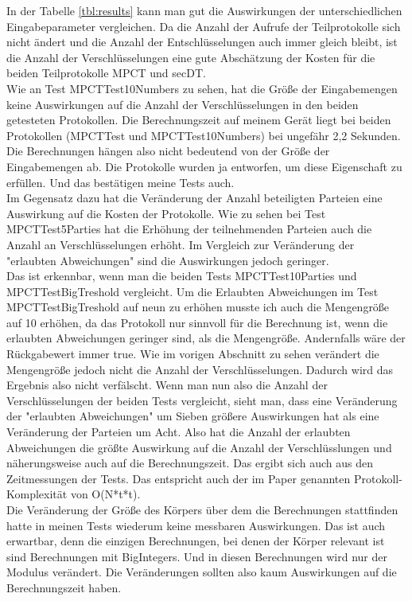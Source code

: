 In der Tabelle \ref{tbl:results} kann man gut die Auswirkungen der unterschiedlichen Eingabeparameter vergleichen. Da die Anzahl der Aufrufe der Teilprotokolle sich nicht ändert und die Anzahl der Entschlüsselungen auch immer gleich bleibt, ist die Anzahl der Verschlüsselungen eine gute Abschätzung der Kosten für die beiden Teilprotokolle MPCT und secDT.\\
Wie an Test MPCTTest10Numbers zu sehen, hat die Größe der Eingabemengen keine Auswirkungen auf die Anzahl der Verschlüsselungen in den beiden getesteten Protokollen. Die Berechnungszeit auf meinem Gerät liegt bei beiden Protokollen (MPCTTest und MPCTTest10Numbers) bei ungefähr 2,2 Sekunden. Die Berechnungen hängen also nicht bedeutend von der Größe der Eingabemengen ab. Die Protokolle wurden ja entworfen, um diese Eigenschaft zu erfüllen. \cite{Doettling2021} Und das bestätigen meine Tests auch.\\
Im Gegensatz dazu hat die Veränderung der Anzahl beteiligten Parteien eine Auswirkung auf die Kosten der Protokolle. Wie zu sehen bei Test MPCTTest5Parties hat die Erhöhung der teilnehmenden Parteien auch die Anzahl an Verschlüsselungen erhöht.
Im Vergleich zur Veränderung der "erlaubten Abweichungen" sind die Auswirkungen jedoch geringer.\\
Das ist erkennbar, wenn man die beiden Tests MPCTTest10Parties und MPCTTestBigTreshold vergleicht. Um die Erlaubten Abweichungen im Test MPCTTestBigTreshold auf neun zu erhöhen musste ich auch die Mengengröße auf 10 erhöhen, da das Protokoll nur sinnvoll für die Berechnung ist, wenn die erlaubten Abweichungen geringer sind, als die Mengengröße. Andernfalls wäre der Rückgabewert immer true. Wie im vorigen Abschnitt zu sehen verändert die Mengengröße jedoch nicht die Anzahl der Verschlüsselungen. Dadurch wird das Ergebnis also nicht verfälscht.
Wenn man nun also die Anzahl der Verschlüsselungen der beiden Tests vergleicht, sieht man, dass eine Veränderung der "erlaubten Abweichungen" um Sieben größere Auswirkungen hat als eine Veränderung der Parteien um Acht. Also hat die Anzahl der erlaubten Abweichungen die größte Auswirkung auf die Anzahl der Verschlüsslungen und näherungsweise auch auf die Berechnungszeit. Das ergibt sich auch aus den Zeitmessungen der Tests. Das entspricht auch der im Paper \cite{Doettling2021} genannten Protokoll-Komplexität von O(N*t*t).\\
Die Veränderung der Größe des Körpers über dem die Berechnungen stattfinden hatte 
in meinen Tests wiederum keine messbaren Auswirkungen. Das ist auch erwartbar, denn die einzigen Berechnungen, bei denen der Körper relevant ist sind Berechnungen mit BigIntegers. Und in diesen Berechnungen wird nur der Modulus verändert. Die Veränderungen sollten also kaum Auswirkungen auf die Berechnungszeit haben.\\


